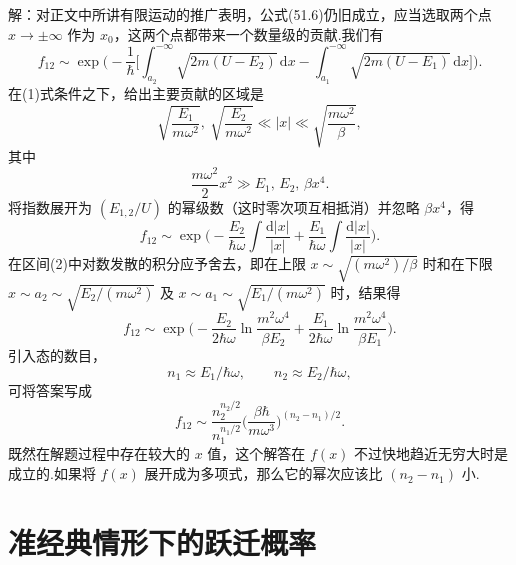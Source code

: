 \begin{xiti}
解：对正文中所讲有限运动的推广表明，公式(51.6)仍旧成立，应当选取两个点 $x\to\pm\infty$ 作为 $x_0$，这两个点都带来一个数量级的贡献.我们有
\begin{equation*}
  f_{12}\sim\exp\bigg(-\frac{1}{\hbar}\bigg[\int_{a_2}^{-\infty}\sqrt{2m(U-E_2)}\,\mathrm{d}x
  -\int_{a_1}^{-\infty}\sqrt{2m(U-E_1)}\,\mathrm{d}x\bigg]\bigg).
\end{equation*}
在(1)式条件之下，给出主要贡献的区域是
\begin{equation}
  \sqrt{\frac{E_1}{m\omega^2}},\ \sqrt{\frac{E_2}{m\omega^2}}\ll|x|
  \ll\sqrt{\frac{m\omega^2}{\beta}},
\end{equation}
其中
\begin{equation*}
  \frac{m\omega^2}{2}x^2\gg E_1,\,E_2,\,\beta x^4.
\end{equation*}
将指数展开为 $(E_{1,2}/U)$ 的幂级数（这时零次项互相抵消）并忽略 $\beta x^4$，得
\begin{equation*}
  f_{12}\sim\exp\bigg(-\frac{E_2}{\hbar\omega}\int\frac{\mathrm{d}|x|}{|x|}
  +\frac{E_1}{\hbar\omega}\int\frac{\mathrm{d}|x|}{|x|}\bigg).
\end{equation*}
在区间(2)中对数发散的积分应予舍去，即在上限 $x\sim\sqrt{(m\omega^2)/\beta}$ 时和在下限 $x\sim a_2\sim\sqrt{E_2/(m\omega^2)}$ 及 $x\sim a_1\sim\sqrt{E_1/(m\omega^2)}$ 时，结果得
\begin{equation*}
  f_{12}\sim\exp\bigg(-\frac{E_2}{2\hbar\omega}\ln\frac{m^2\omega^4}{\beta E_2}
  +\frac{E_1}{2\hbar\omega}\ln\frac{m^2\omega^4}{\beta E_1}\bigg).
\end{equation*}
引入态的数目，
\begin{equation*}
  n_1\approx E_1/\hbar\omega,\qquad n_2\approx E_2/\hbar\omega,
\end{equation*}
可将答案写成
\begin{equation*}
  f_{12}\sim\frac{n_2^{n_2/2}}{n_1^{n_1/2}}
  \bigg(\frac{\beta\hbar}{m\omega^3}\bigg)^{(n_2-n_1)/2}.
\end{equation*}
既然在解题过程中存在较大的 $x$ 值，这个解答在 $f(x)$ 不过快地趋近无穷大时是成立的.如果将 $f(x)$ 展开成为多项式，那么它的幂次应该比 $(n_2-n_1)$ 小.

\end{xiti}
\renewcommand{\theequation}{\arabic{section}.\arabic{equation}}%

\section{准经典情形下的跃迁概率}

